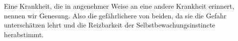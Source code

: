 Eine Krankheit, die in angenehmer Weise an eine andere Krankheit erinnert, nennen wir Genesung. Also die gefährlichere von beiden, da sie die Gefahr unterschätzen lehrt und die Reizbarkeit der Selbstbewachungsinstincte herabstimmt.
\par

